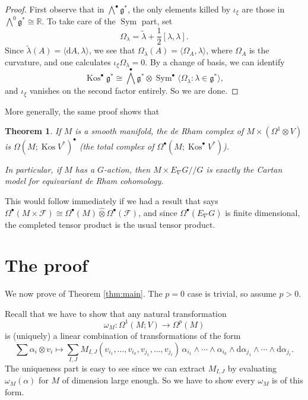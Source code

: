 \documentclass{shortart}
\newtheorem{thm}{Theorem}
\theoremstyle{definition}
\DeclareMathOperator\Sym{Sym}
\DeclareMathOperator\Kos{Kos}
\newcommand\R{\mathbb{R}}
\newcommand\modmod{/\!/}
\newcommand\exterior{{\textstyle \bigwedge}}
\renewcommand\d{\mathrm{d}}
\begin{document}
\begin{proof}
  First observe that in $\exterior^\bullet \mathfrak{g}^*$, the only elements killed by $\iota_\xi$ are those in $\exterior^0 \mathfrak{g}^* \cong \R$. To take care of the $\Sym$ part, set
  \[
    \Omega_\lambda = \tilde{\lambda} + \frac{1}{2}[\lambda, \lambda].
  \]
  Since $\tilde{\lambda}(A) = \langle \d A, \lambda\rangle$, we see that $\Omega_\lambda(A) = \langle \Omega_A, \lambda\rangle$, where $\Omega_A$ is the curvature, and one calculates $\iota_\xi \Omega_\lambda = 0$. By a change of basis, we can identify
  \[
    \Kos^\bullet \mathfrak{g}^* \cong \exterior^\bullet \mathfrak{g}^* \otimes \Sym^\bullet \langle \Omega_\lambda: \lambda \in \mathfrak{g}^*\rangle,
  \]
  and $\iota_\xi$ vanishes on the second factor entirely. So we are done.
\end{proof}

More generally, the same proof shows that
\begin{thm}
  If $M$ is a smooth manifold, the de Rham complex of $M \times (\Omega^1 \otimes V)$ is $\Omega(M; \Kos V^*)^\bullet$ (the total complex of $\Omega^\bullet(M; \Kos^\bullet V^*)$).

  In particular, if $M$ has a $G$-action, then $M \times E_\nabla G \modmod G$ is exactly the Cartan model for equivariant de Rham cohomology.
\end{thm}
This would follow immediately if we had a result that says $\Omega^\bullet(M \times \mathcal{F}) \cong \Omega^\bullet(M) \hat{\otimes} \Omega^\bullet (\mathcal{F})$, and since $\Omega^\bullet(E_\nabla G)$ is finite dimensional, the completed tensor product is the usual tensor product.

\section{The proof}\label{section:proof}
We now prove of Theorem \ref{thm:main}. The $p = 0$ case is trivial, so assume $p > 0$.

Recall that we have to show that any natural transformation
\[
  \omega_M: \Omega^1(M; V) \to \Omega^p(M)
\]
is (uniquely) a linear combination of transformations of the form
\[
  \sum \alpha_i \otimes v_i \mapsto \sum_{I, J} M_{I, J}(v_{i_1}, \ldots, v_{i_k}, v_{j_1}, \ldots, v_{j_\ell})\, \alpha_{i_1} \wedge \cdots \wedge \alpha_{i_k} \wedge \d \alpha_{j_1} \wedge \cdots \wedge \d \alpha_{j_\ell}.
\]
The uniqueness part is easy to see since we can extract $M_{I, J}$ by evaluating $\omega_M(\alpha)$ for $M$ of dimension large enough. So we have to show every $\omega_M$ is of this form.
\end{document}
